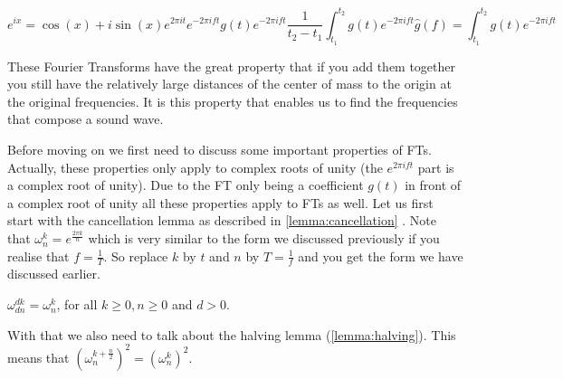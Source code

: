 \begin{subequations}
    \begin{equation}
        \label{eq:euler}
        e^{ix} = \cos(x) + i\sin(x)
    \end{equation}
    \begin{equation}
        \label{eq:euler rotate}
        e^{2\pi it}
    \end{equation}
    \begin{equation}
        \label{eq:euler freq}
        e^{-2\pi ift}
    \end{equation}
    \begin{equation}
        \label{eq:euler wave}
        g(t)e^{-2\pi ift}
    \end{equation}
    \begin{equation}
        \label{eq:euler int}
        \frac{1}{t_2 - t_1}\int^{t_2}_{t_1}g(t)e^{-2\pi ift}
    \end{equation}
    \begin{equation}
        \label{eq:ft}
        \hat{g}(f) = \int^{t_2}_{t_1}g(t)e^{-2\pi ift}
    \end{equation}
\end{subequations}

These Fourier Transforms have the great property that if you add them together you still have the relatively large distances of the center of mass to the origin at the original frequencies. It 
is this property that enables us to find the frequencies that compose a sound wave. 

Before moving on we first need to discuss some important properties of FTs. Actually, these properties only apply to complex roots of unity (the $e^{2\pi ift}$ part is a complex root of unity). 
Due to the FT only being a coefficient $g(t)$ in front of a complex root of unity all these properties apply to FTs as well. Let us first start with the cancellation lemma as described in
\autoref{lemma:cancellation} \cite{cancellation}. Note that $\omega^k_n = e^{\frac{2\pi k}{n}}$ which is very similar to the form we discussed previously if you realise that $f = \frac{1}{T}$. 
So replace $k$ by $t$ and $n$ by $T = \frac{1}{f}$ and you get the form we have discussed earlier.

\begin{lemma} \label{lemma:cancellation}
    $\omega^{dk}_{dn} = \omega^k_n$, for all $k \geq 0, n \geq 0$ and $d > 0$.
\end{lemma}

With that we also need to talk about the halving lemma (\autoref{lemma:halving}). This means that $(\omega^{k + \frac{n}{2}}_n)^2 = (\omega^k_n)^2$. 


